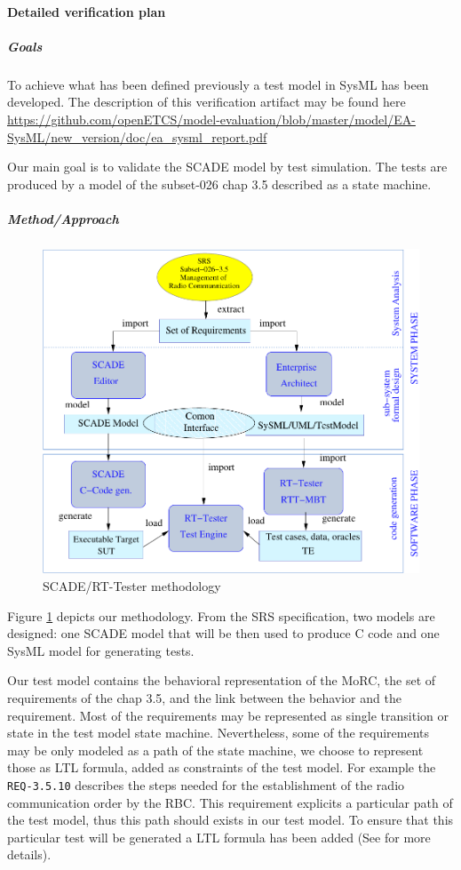 \paragraph{Detailed verification plan}

\subparagraph{Goals}

To achieve what has been defined previously a test model in SysML has
been developed. The description of this verification artifact may be
found here \url{https://github.com/openETCS/model-evaluation/blob/master/model/EA-SysML/new_version/doc/ea_sysml_report.pdf}

Our main goal is to validate the SCADE model by test simulation. The
tests are produced by a model of the subset-026 chap 3.5 described as a
state machine.

\subparagraph{Method/Approach}

\begin{figure}
\includegraphics[width=\textwidth]{schema/framework}
\caption{\label{fig:method}SCADE/RT-Tester methodology}
\end{figure}

Figure \ref{fig:method} depicts our methodology. From the SRS
specification, two models are designed: one SCADE model that will
be then  used to produce C code and one SysML model for generating
tests.

Our test model contains the behavioral representation of the MoRC, the
set of requirements of the chap 3.5, and the link between the behavior
and the requirement.  Most of the requirements may be represented as
single transition or state in the test model state
machine. Nevertheless, some of the requirements may be only modeled as
a path of the state machine, we choose to represent those as LTL
formula, added as constraints of the test model. For example the
\verb+REQ-3.5.10+ describes the steps needed for the establishment of
the radio communication order by the RBC. This requirement explicits a
particular path of the test model, thus this path should exists in our
test model. To ensure that this particular test will be generated a LTL
formula has been added (See \cite{braunstein_MorC_2013} for more
details).

